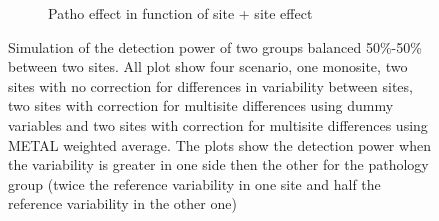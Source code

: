 \documentclass[authoryear]{elsarticle}
\begin{document}
\begin{figure}
\begin{subfigure}[b]{0.475\textwidth}
            {{\tiny Patho effect in function of site + site effect}}    
            \label{fig:mean and std of net44}
        \end{subfigure}
        \caption[]
        {\small Simulation of the detection power of two groups balanced 50\%-50\% between two sites. All plot show four scenario, one monosite, two sites with no correction for differences in variability between sites, two sites with correction for multisite differences using dummy variables and two sites with correction for multisite differences using METAL weighted average. The plots show the detection power when the variability is greater in one side then the other for the pathology group (twice the reference variability in one site and half the reference variability in the other one)} 
        \label{fig:sim_5050}
    \end{figure}
    
    
    
\end{document}
